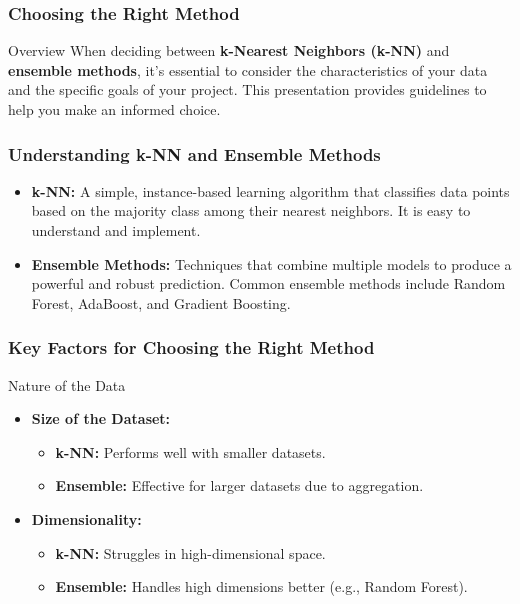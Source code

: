 \documentclass[aspectratio=169]{beamer}
\begin{document}
\begin{frame}[fragile]
    \frametitle{Choosing the Right Method}
    \begin{block}{Overview}
        When deciding between \textbf{k-Nearest Neighbors (k-NN)} and \textbf{ensemble methods}, it's essential to consider the characteristics of your data and the specific goals of your project. This presentation provides guidelines to help you make an informed choice.
    \end{block}
\end{frame}

\begin{frame}[fragile]
    \frametitle{Understanding k-NN and Ensemble Methods}
    \begin{itemize}
        \item \textbf{k-NN:} A simple, instance-based learning algorithm that classifies data points based on the majority class among their nearest neighbors. It is easy to understand and implement.
        \item \textbf{Ensemble Methods:} Techniques that combine multiple models to produce a powerful and robust prediction. Common ensemble methods include Random Forest, AdaBoost, and Gradient Boosting.
    \end{itemize}
\end{frame}

\begin{frame}[fragile]
    \frametitle{Key Factors for Choosing the Right Method}
    \begin{block}{Nature of the Data}
        \begin{itemize}
            \item \textbf{Size of the Dataset:}
                \begin{itemize}
                    \item \textbf{k-NN:} Performs well with smaller datasets.
                    \item \textbf{Ensemble:} Effective for larger datasets due to aggregation.
                \end{itemize}
            \item \textbf{Dimensionality:}
                \begin{itemize}
                    \item \textbf{k-NN:} Struggles in high-dimensional space.
                    \item \textbf{Ensemble:} Handles high dimensions better (e.g., Random Forest).
                \end{itemize}
        \end{itemize}
    \end{block}
\end{frame}
\end{document}
